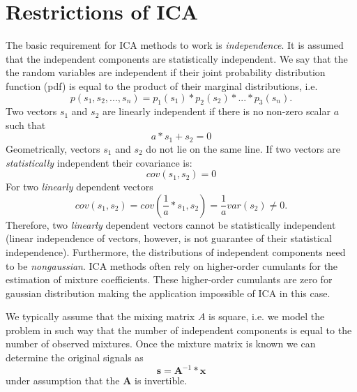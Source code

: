 \documentclass{article}
\begin{document}
\section{Restrictions of ICA}
The basic requirement for ICA methods to work is \textit{independence}. It is assumed that the
independent components are statistically independent. We say that the the random variables are
independent if their joint probability distribution function (pdf) is equal to the product of their marginal distributions, i.e.
\begin{equation}
    p(s_1, s_2, ..., s_n) = p_1(s_1) * p_2(s_2) * ... * p_3(s_n) .
\end{equation}
Two vectors $s_1$ and $s_2$ are linearly independent if there is no non-zero scalar $a$ such that
\begin{equation}
    a*s_1 + s_2 = 0
\end{equation}
Geometrically, vectors $s_1$ and $s_2$ do not lie on the same line. If two vectors are \textit{statistically} independent their covariance is:
\begin{equation}
    cov(s_1, s_2) = 0
\end{equation}
For two \textit{linearly} dependent vectors
\begin{equation}
    cov(s_1, s_2) = cov(\frac{1}{a} * s_1, s_2) = \frac{1}{a} var(s_2) \neq 0.
\end{equation}
Therefore, two \textit{linearly} dependent vectors cannot be statistically independent (linear independence of vectors, however, is not guarantee of their statistical independence).
Furthermore, the distributions of independent components need to be \textit{nongaussian}. ICA methods often rely on higher-order cumulants for the estimation of mixture coefficients. These
higher-order cumulants are zero for gaussian distribution making the application impossible of ICA in this case.

We typically assume that the mixing matrix $A$ is square, i.e. we model the problem in such way that the number of independent components is equal to the number of observed mixtures. Once the mixture matrix is known we can determine the original signals as
\begin{equation}
    \textbf{s} = \textbf{A}^{-1} * \textbf{x}
\end{equation}
under assumption that the $\textbf{A}$ is invertible.
\end{document}
